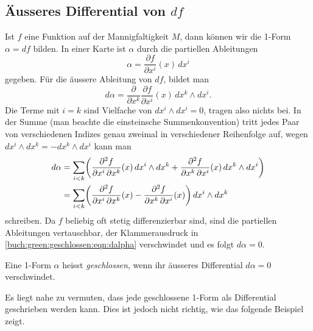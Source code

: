 \subsection{Äusseres Differential von $df$}
Ist $f$ eine Funktion auf der Mannigfaltigkeit $M$, dann können wir
die 1-Form $\alpha = df$ bilden.
In einer Karte ist $\alpha$ durch die partiellen Ableitungen
\[
\alpha
=
\frac{\partial f}{\partial x^i}(x)\,dx^i
\]
gegeben.
Für die äussere Ableitung von $df$, bildet man
\[
d\alpha
=
\frac{\partial}{\partial x^k}
\frac{\partial f}{\partial x^i}(x)\,
dx^k
\wedge
dx^i.
\]
Die Terme mit $i=k$ sind Vielfache von $dx^i\wedge dx^i=0$, tragen
also nichts bei.
In der Summe (man beachte die einsteinsche Summenkonvention)
tritt jedes Paar von verschiedenen Indizes genau zweimal in verschiedener
Reihenfolge auf, wegen $dx^i\wedge dx^k = - dx^k \wedge dx^i$ kann man
\begin{align}
d\alpha
&=
\sum_{i < k}
\biggl(
\frac{\partial^2 f}{\partial x^i\,\partial x^k}(x)\, dx^i\wedge dx^k
+
\frac{\partial^2 f}{\partial x^k\,\partial x^i}(x)\, dx^k\wedge dx^i
\biggr)
\notag
\\
&=
\sum_{i < k}
\biggl(
\frac{\partial^2 f}{\partial x^i\,\partial x^k}(x)
-
\frac{\partial^2 f}{\partial x^k\,\partial x^i}(x)
\biggr)
\, dx^i\wedge dx^k
\label{buch:green:geschlossen:eqn:dalpha}
\end{align}
schreiben.
Da $f$ beliebig oft stetig differenzierbar sind, sind die partiellen
Ableitungen vertauschbar, der Klammerausdruck in
\eqref{buch:green:geschlossen:eqn:dalpha}
verschwindet und es folgt $d\alpha = 0$.

\begin{definition}
%
Eine 1-Form $\alpha$ heisst {\em geschlossen}, wenn ihr äusseres
Differential $d\alpha=0$ verschwindet.
\end{definition}

Es liegt nahe zu vermuten, dass jede geschlossene 1-Form als Differential
geschrieben werden kann.
Dies ist jedoch nicht richtig, wie das folgende Beispiel zeigt.

